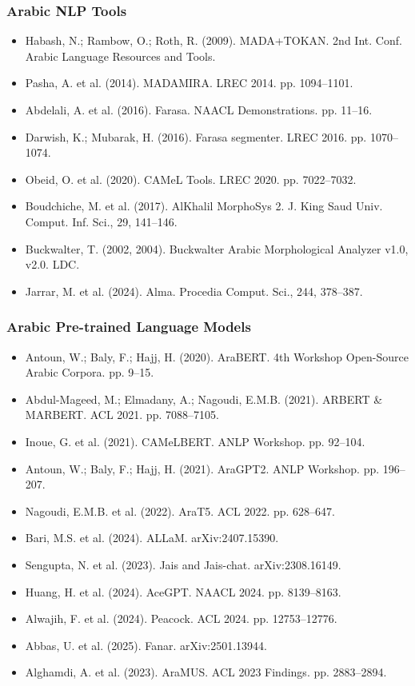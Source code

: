 \documentclass[12pt,a4paper]{article}
\providecommand{\tightlist}{\setlength{\itemsep}{0pt}\setlength{\parskip}{0pt}}
\begin{document}
\subsubsection{Arabic NLP Tools}\label{arabic-nlp-tools}

\begin{itemize}
\tightlist
\item
  Habash, N.; Rambow, O.; Roth, R. (2009). MADA+TOKAN. 2nd Int. Conf.
  Arabic Language Resources and Tools.
\item
  Pasha, A. et al. (2014). MADAMIRA. LREC 2014. pp. 1094--1101.
\item
  Abdelali, A. et al. (2016). Farasa. NAACL Demonstrations. pp. 11--16.
\item
  Darwish, K.; Mubarak, H. (2016). Farasa segmenter. LREC 2016. pp.
  1070--1074.
\item
  Obeid, O. et al. (2020). CAMeL Tools. LREC 2020. pp. 7022--7032.
\item
  Boudchiche, M. et al. (2017). AlKhalil MorphoSys 2. J. King Saud Univ.
  Comput. Inf. Sci., 29, 141--146.
\item
  Buckwalter, T. (2002, 2004). Buckwalter Arabic Morphological Analyzer
  v1.0, v2.0. LDC.
\item
  Jarrar, M. et al. (2024). Alma. Procedia Comput. Sci., 244, 378--387.
\end{itemize}

\subsubsection{Arabic Pre-trained Language
Models}\label{arabic-pre-trained-language-models}

\begin{itemize}
\tightlist
\item
  Antoun, W.; Baly, F.; Hajj, H. (2020). AraBERT. 4th Workshop
  Open-Source Arabic Corpora. pp. 9--15.
\item
  Abdul-Mageed, M.; Elmadany, A.; Nagoudi, E.M.B. (2021). ARBERT \&
  MARBERT. ACL 2021. pp. 7088--7105.
\item
  Inoue, G. et al. (2021). CAMeLBERT. ANLP Workshop. pp. 92--104.
\item
  Antoun, W.; Baly, F.; Hajj, H. (2021). AraGPT2. ANLP Workshop. pp.
  196--207.
\item
  Nagoudi, E.M.B. et al. (2022). AraT5. ACL 2022. pp. 628--647.
\item
  Bari, M.S. et al. (2024). ALLaM. arXiv:2407.15390.
\item
  Sengupta, N. et al. (2023). Jais and Jais-chat. arXiv:2308.16149.
\item
  Huang, H. et al. (2024). AceGPT. NAACL 2024. pp. 8139--8163.
\item
  Alwajih, F. et al. (2024). Peacock. ACL 2024. pp. 12753--12776.
\item
  Abbas, U. et al. (2025). Fanar. arXiv:2501.13944.
\item
  Alghamdi, A. et al. (2023). AraMUS. ACL 2023 Findings. pp. 2883--2894.
\end{itemize}
\end{document}
